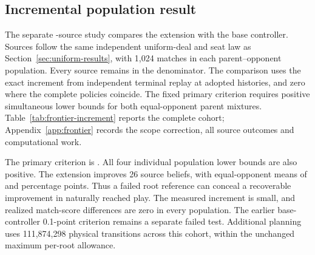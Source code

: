 \subsection{Incremental population result}\label{sec:incremental-results}

The separate \FrontierIncrementSources{}-source study compares the extension
with the base controller. Sources follow the same independent uniform-deal
and seat law as Section~\ref{sec:uniform-results}, with 1,024 matches in each
parent--opponent population. Every source remains in the denominator. The
comparison uses the exact increment from independent terminal replay at
adopted histories, and zero where the complete policies coincide.
The fixed primary criterion requires positive simultaneous lower bounds for
both equal-opponent parent mixtures. Table~\ref{tab:frontier-increment} reports
the complete cohort; Appendix~\ref{app:frontier} records the scope correction,
all source outcomes and computational work.

\begin{table}[htbp]
\centering\small

\caption{Frontier extension minus base controller: expected terminal win-score
increments in percentage points. Bounds are simultaneous at 95\% across the
four populations; the fixed equal-weight mixtures inherit that coverage.
All 4,096 sources contribute, including missing roots and unchanged policies.
Lower bounds are rounded downward.}
\label{tab:frontier-increment}
\end{table}

The primary criterion is \FrontierIncrementCriterion{}. All four individual
population lower bounds are also positive. The extension improves 26 source
beliefs, with equal-opponent means of \FrontierIncrementMeanOne{} and
\FrontierIncrementMeanTwo{} percentage points. Thus a failed root reference
can conceal a recoverable improvement in naturally reached play. The measured
increment is small, and realized match-score differences are zero in every
population. The earlier base-controller 0.1-point criterion remains a separate
failed test. Additional planning uses 111,874,298 physical transitions across
this cohort, within the unchanged maximum per-root allowance.
